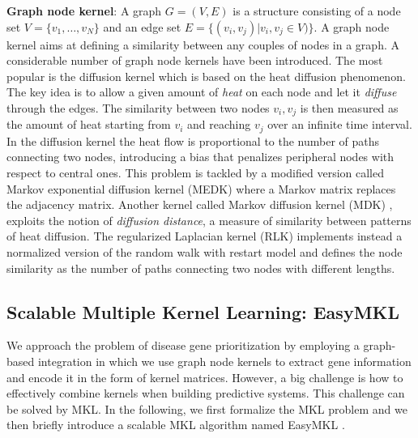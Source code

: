 \documentclass[twocolumn]{bmcart}%
\begin{document}
\textbf{Graph node kernel}: A graph $G = (V,E)$ is a structure consisting of a node set $V=\{v_1,\dots,v_N\}$ and an edge set $E=\{(v_i,v_j) | v_i,v_j \in V)\}$. A graph node kernel aims at defining a similarity between any couples of nodes in a graph. A considerable number of graph node kernels have been introduced. The most popular is the diffusion kernel \cite{dk} which is based on the heat diffusion phenomenon. The key idea is to allow a given amount of {\em heat} on each node and let it {\em diffuse} through the edges. The similarity between two nodes $v_{i}, v_{j}$ is then measured as the amount of heat starting from $v_{i}$ and reaching $v_{j}$ over an infinite time interval. In the diffusion kernel the heat flow is proportional to the number of paths connecting two nodes, introducing a bias that penalizes peripheral nodes with respect to central ones. This problem is tackled by a modified version called Markov exponential diffusion kernel (MEDK) \cite{mrf} where a Markov matrix replaces the adjacency matrix.  Another kernel called Markov diffusion kernel (MDK) \cite{mdk}, exploits the notion of {\em diffusion distance}, a measure of similarity between patterns of heat diffusion. The regularized Laplacian kernel (RLK) \cite{rlk} implements instead a normalized version of the random walk with restart model and defines the node similarity as the number of paths connecting two nodes with different lengths.

\subsection*{Scalable Multiple Kernel Learning: EasyMKL}
We approach the problem of disease gene prioritization by employing a graph-based integration in which we use graph node kernels to extract gene information and encode it in the form of kernel matrices. However, a big challenge is how to effectively combine kernels when building predictive systems. This challenge can be solved by MKL. In the following, we first formalize the MKL problem and we then briefly introduce a scalable MKL algorithm named EasyMKL \cite{easymkl}.
\end{document}
